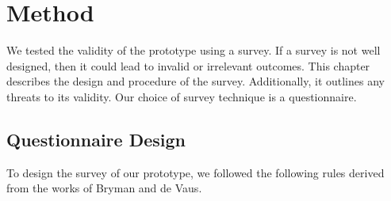 \section{Method}
\label{section:survey_method}

We tested the validity of the prototype using a survey.
If a survey is not well designed, then it could lead to invalid or irrelevant outcomes.
This chapter describes the design and procedure of the survey.
Additionally, it outlines any threats to its validity.
Our choice of survey technique is a questionnaire. 

\subsection{Questionnaire Design}
To design the survey of our prototype, we followed the following rules derived from the works of Bryman\cite{bryman2016social} and de Vaus\cite{de2013surveys}.

